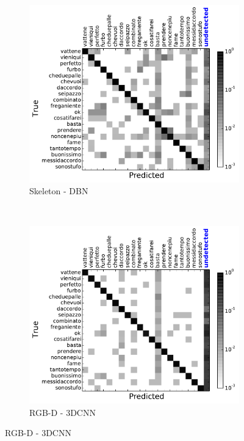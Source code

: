 \begin{figure}[t]
        \centering
        \begin{subfigure}[c]{.4\textwidth}
                \includegraphics[width=\textwidth]{images/cm/cm_sk}
\vspace*{-3mm}
                \caption{\small{Skeleton - DBN}}
                \label{sk_cm}
        \end{subfigure}%
        ~ %

        \begin{subfigure}[c]{0.4\textwidth}
                \includegraphics[width=\textwidth]{images/cm/cm_cnn}
\vspace*{-3mm}
                \caption{\small{RGB-D - 3DCNN}}
                \label{cnn_cm}
        \end{subfigure}


\end{figure}
